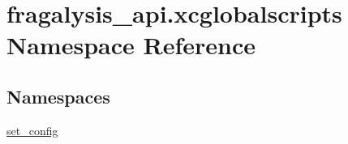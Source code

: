 \hypertarget{namespacefragalysis__api_1_1xcglobalscripts}{}\section{fragalysis\+\_\+api.\+xcglobalscripts Namespace Reference}
\label{namespacefragalysis__api_1_1xcglobalscripts}
\subsection*{Namespaces}
\begin{DoxyCompactItemize}
\item 
 \hyperlink{namespacefragalysis__api_1_1xcglobalscripts_1_1set__config}{set\+\_\+config}
\end{DoxyCompactItemize}
